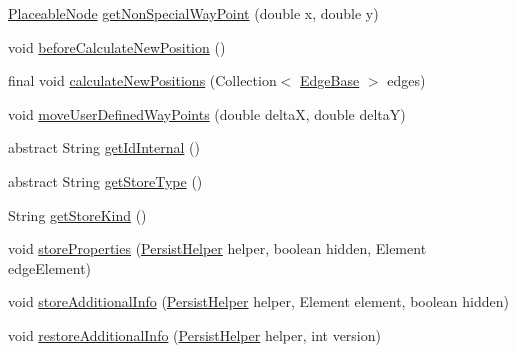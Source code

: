 \begin{DoxyCompactItemize}
\item 
\hyperlink{classorg_1_1tzi_1_1use_1_1gui_1_1views_1_1diagrams_1_1elements_1_1_placeable_node}{Placeable\-Node} \hyperlink{classorg_1_1tzi_1_1use_1_1gui_1_1views_1_1diagrams_1_1elements_1_1edges_1_1_edge_base_ab43ee4ba4599eb4894fb85166d8ff03d}{get\-Non\-Special\-Way\-Point} (double x, double y)
\item 
void \hyperlink{classorg_1_1tzi_1_1use_1_1gui_1_1views_1_1diagrams_1_1elements_1_1edges_1_1_edge_base_ac373cb7bc0760bb350f8a38b165540b3}{before\-Calculate\-New\-Position} ()
\item 
final void \hyperlink{classorg_1_1tzi_1_1use_1_1gui_1_1views_1_1diagrams_1_1elements_1_1edges_1_1_edge_base_ae7aee9942416bba41c5aeff139a489d9}{calculate\-New\-Positions} (Collection$<$ \hyperlink{classorg_1_1tzi_1_1use_1_1gui_1_1views_1_1diagrams_1_1elements_1_1edges_1_1_edge_base}{Edge\-Base} $>$ edges)
\item 
void \hyperlink{classorg_1_1tzi_1_1use_1_1gui_1_1views_1_1diagrams_1_1elements_1_1edges_1_1_edge_base_a7c305acfa6d2dc360e70826657bbcbc9}{move\-User\-Defined\-Way\-Points} (double delta\-X, double delta\-Y)
\item 
abstract String \hyperlink{classorg_1_1tzi_1_1use_1_1gui_1_1views_1_1diagrams_1_1elements_1_1edges_1_1_edge_base_afa27f672c3ed518a03045fce8cbf7e05}{get\-Id\-Internal} ()
\item 
abstract String \hyperlink{classorg_1_1tzi_1_1use_1_1gui_1_1views_1_1diagrams_1_1elements_1_1edges_1_1_edge_base_a6e3278d6ed3eb0880ba781ee4ce3d4bb}{get\-Store\-Type} ()
\item 
String \hyperlink{classorg_1_1tzi_1_1use_1_1gui_1_1views_1_1diagrams_1_1elements_1_1edges_1_1_edge_base_affb46bd03ec98de39926199d659257dd}{get\-Store\-Kind} ()
\item 
void \hyperlink{classorg_1_1tzi_1_1use_1_1gui_1_1views_1_1diagrams_1_1elements_1_1edges_1_1_edge_base_a85168fe69a077cd9961c41f7ef97bd93}{store\-Properties} (\hyperlink{classorg_1_1tzi_1_1use_1_1gui_1_1util_1_1_persist_helper}{Persist\-Helper} helper, boolean hidden, Element edge\-Element)
\item 
void \hyperlink{classorg_1_1tzi_1_1use_1_1gui_1_1views_1_1diagrams_1_1elements_1_1edges_1_1_edge_base_a95076f8a444c62f537cdf4b9f908bf6c}{store\-Additional\-Info} (\hyperlink{classorg_1_1tzi_1_1use_1_1gui_1_1util_1_1_persist_helper}{Persist\-Helper} helper, Element element, boolean hidden)
\item 
void \hyperlink{classorg_1_1tzi_1_1use_1_1gui_1_1views_1_1diagrams_1_1elements_1_1edges_1_1_edge_base_a21da7090af987d390fda1436c98ed921}{restore\-Additional\-Info} (\hyperlink{classorg_1_1tzi_1_1use_1_1gui_1_1util_1_1_persist_helper}{Persist\-Helper} helper, int version)

\end{DoxyCompactItemize}
